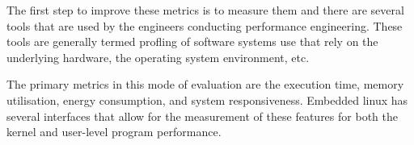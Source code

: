 The first step to improve these metrics is to measure them and there are several tools that are used by the engineers conducting performance engineering. These tools are generally termed profling of software systems use that rely on the underlying hardware, the operating system environment, etc.

The primary metrics in this mode of evaluation are the execution time, memory utilisation, energy consumption, and system responsiveness. Embedded linux has several interfaces that allow for the measurement of these features for both the kernel and user-level program performance.






